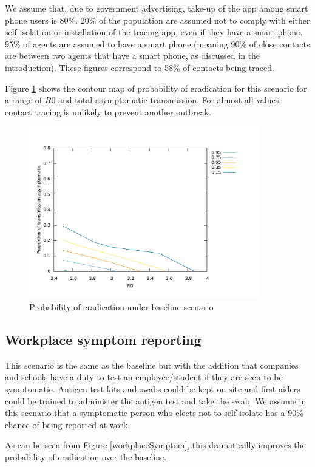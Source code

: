 \documentclass{article}
\begin{document}
We assume that, due to government advertising, take-up of the app among smart phone users is 80\%. 20\% of the population are assumed not to comply with either self-isolation or installation of the tracing app, even if they have a smart phone.  95\% of agents are assumed to have a smart phone (meaning 90\% of close contacts are between two agents that have a smart phone, as discussed in the introduction). These figures correspond to 58\% of contacts being traced.

Figure \ref{baseline} shows the contour map of probability of eradication for this scenario for a range of $R0$ and total asymptomatic transmission. For almost all values, contact tracing is unlikely to prevent another outbreak.

\begin{figure}
\begin{center}
\includegraphics[width = 10cm]{baseline.pdf}
\end{center}
\caption{Probability of eradication under baseline scenario}
\label{baseline}
\end{figure}

\subsection{Workplace symptom reporting}

This scenario is the same as the baseline but with the addition that companies and schools have a duty to test an employee/student if they are seen to be symptomatic. Antigen test kits and swabs could be kept on-site and first aiders could be trained to administer the antigen test and take the swab. We assume in this scenario that a symptomatic person who elects not to self-isolate has a 90\% chance of being reported at work.

As can be seen from Figure \ref{workplaceSymptom}, this dramatically improves the probability of eradication over the baseline.
\end{document}
